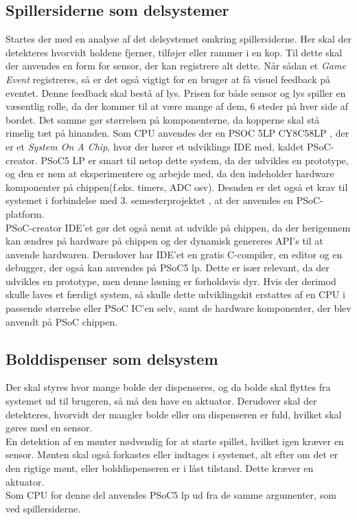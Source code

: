 \documentclass[a4paper,12pt,fleqn,oneside]{article}
\begin{document}
\subsection{Spillersiderne som delsystemer}
Startes der med en analyse af det delsystemet omkring spillersiderne. Her skal der detekteres hvorvidt holdene fjerner, tilføjer eller rammer i en kop. Til dette skal der anvendes en form for sensor, der kan registrere alt dette. Når sådan et \textit{Game Event} registreres, så er det også vigtigt for en bruger at få visuel feedback på eventet. Denne feedback skal bestå af lys. Prisen for både sensor og lys spiller en væsentlig rolle, da der kommer til at være mange af dem, 6 steder på hver side af bordet. Det samme gør størrelsen på komponenterne, da kopperne skal stå rimelig tæt på hinanden.
Som CPU anvendes der en PSOC 5LP CY8C58LP \cite{psoc5lp}, der er et \textit{System On A Chip}, hvor der hører et udviklings IDE med, kaldet PSoC-creator. PSoC5 LP er smart til netop dette system, da der udvikles en prototype, og den er nem at eksperimentere og arbejde med, da den indeholder hardware komponenter på chippen(f.eks. timers, ADC osv). Desuden er det også et krav til systemet i forbindelse med 3. semesterprojektet \cite{Universitet2018}, at der anvendes en PSoC-platform.\\ PSoC-creator IDE'et gør det også nemt at udvikle på chippen, da der herigennem kan ændres på hardware på chippen og der dynamisk genereres API's til at anvende hardwaren. Derudover har IDE'et en gratis C-compiler, en editor og en debugger, der også kan anvendes på PSoC5 lp. Dette er især relevant, da der udvikles en prototype, men denne løsning er forholdsvis dyr. Hvis der derimod skulle laves et færdigt system, så skulle dette udviklingskit erstattes af en CPU i passende størrelse eller PSoC IC'en selv, samt de hardware komponenter, der blev anvendt på PSoC chippen.
\subsection{Bolddispenser som delsystem}
 Der skal styres hvor mange bolde der dispenseres, og da bolde skal flyttes fra systemet ud til brugeren, så må den have en aktuator. Derudover skal der detekteres, hvorvidt der mangler bolde eller om dispenseren er fuld, hvilket skal gøres med en sensor. \\
 En detektion af en mønter nødvendig for at starte spillet, hvilket igen kræver en sensor. Mønten skal også forkastes eller indtages i systemet, alt efter om det er den rigtige mønt, eller bolddispenseren er i låst tilstand. Dette kræver en aktuator.\\
Som CPU for denne del anvendes PSoC5 lp ud fra de samme argumenter, som ved spillersiderne.
\end{document}
